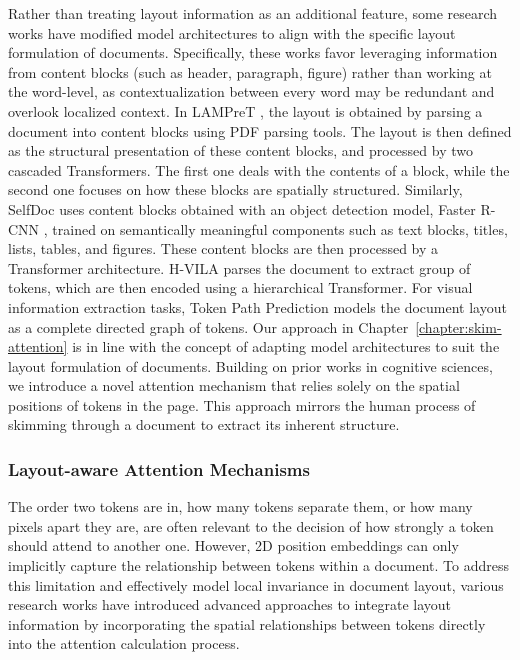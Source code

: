 Rather than treating layout information as an additional feature, some research works have modified model architectures to align with the specific layout formulation of documents. Specifically, these works favor leveraging information from content blocks (such as header, paragraph, figure) rather than working at the word-level, as contextualization between every word may be redundant and overlook localized context. In \ac{LAMPreT} \citep{wu2021lampret}, the layout is obtained by parsing a document into content blocks using PDF parsing tools. The layout is then defined as the structural presentation of these content blocks, and processed by two cascaded Transformers. The first one deals with the contents of a block, while the second one focuses on how these blocks are spatially structured. Similarly, SelfDoc \citep{li2021selfdoc} uses content blocks obtained with an object detection model, Faster R-CNN \citep{ren2015faster}, trained on semantically meaningful components such as text blocks, titles, lists, tables, and figures. These content blocks are then processed by a Transformer architecture. H-VILA \citep{shen2022vila} parses the document to extract group of tokens, which are then encoded using a hierarchical Transformer. For visual information extraction tasks, Token Path Prediction \citep{zhang2023reading} models the document layout as a complete directed graph of tokens. Our approach  in Chapter~\ref{chapter:skim-attention} is in line with the concept of adapting model architectures to suit the layout formulation of documents. Building on prior works in cognitive sciences, we introduce a novel attention mechanism that relies solely on the spatial positions of tokens in the page. This approach mirrors the human process of skimming through a document to extract its inherent structure.


\subsubsection{Layout-aware Attention Mechanisms}

The order two tokens are in, how many tokens separate them, or how many pixels apart they are, are often relevant to the decision of how strongly a token should attend to another one. However, 2D position embeddings can only implicitly capture the relationship between tokens within a document. To address this limitation and effectively model local invariance in document layout, various research works have introduced advanced approaches to integrate layout information by incorporating the spatial relationships between tokens directly into the attention calculation process.

